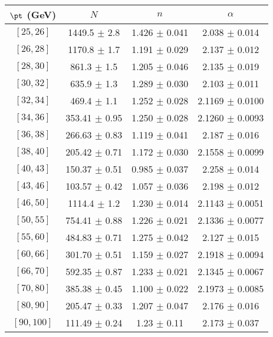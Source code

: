 \begin{tabular}{c||c|c|c}
$\pt$ (GeV) & $N$ & $n$ & $\alpha$ \\
\hline
$[25, 26]$ & 1449.5 $\pm$ 2.8 & 1.426 $\pm$ 0.041 & 2.038 $\pm$ 0.014\\
$[26, 28]$ & 1170.8 $\pm$ 1.7 & 1.191 $\pm$ 0.029 & 2.137 $\pm$ 0.012\\
$[28, 30]$ & 861.3 $\pm$ 1.5 & 1.205 $\pm$ 0.046 & 2.135 $\pm$ 0.019\\
$[30, 32]$ & 635.9 $\pm$ 1.3 & 1.289 $\pm$ 0.030 & 2.103 $\pm$ 0.011\\
$[32, 34]$ & 469.4 $\pm$ 1.1 & 1.252 $\pm$ 0.028 & 2.1169 $\pm$ 0.0100\\
$[34, 36]$ & 353.41 $\pm$ 0.95 & 1.250 $\pm$ 0.028 & 2.1260 $\pm$ 0.0093\\
$[36, 38]$ & 266.63 $\pm$ 0.83 & 1.119 $\pm$ 0.041 & 2.187 $\pm$ 0.016\\
$[38, 40]$ & 205.42 $\pm$ 0.71 & 1.172 $\pm$ 0.030 & 2.1558 $\pm$ 0.0099\\
$[40, 43]$ & 150.37 $\pm$ 0.51 & 0.985 $\pm$ 0.037 & 2.258 $\pm$ 0.014\\
$[43, 46]$ & 103.57 $\pm$ 0.42 & 1.057 $\pm$ 0.036 & 2.198 $\pm$ 0.012\\
$[46, 50]$ & 1114.4 $\pm$ 1.2 & 1.230 $\pm$ 0.014 & 2.1143 $\pm$ 0.0051\\
$[50, 55]$ & 754.41 $\pm$ 0.88 & 1.226 $\pm$ 0.021 & 2.1336 $\pm$ 0.0077\\
$[55, 60]$ & 484.83 $\pm$ 0.71 & 1.275 $\pm$ 0.042 & 2.127 $\pm$ 0.015\\
$[60, 66]$ & 301.70 $\pm$ 0.51 & 1.159 $\pm$ 0.027 & 2.1918 $\pm$ 0.0094\\
$[66, 70]$ & 592.35 $\pm$ 0.87 & 1.233 $\pm$ 0.021 & 2.1345 $\pm$ 0.0067\\
$[70, 80]$ & 385.38 $\pm$ 0.45 & 1.100 $\pm$ 0.022 & 2.1973 $\pm$ 0.0085\\
$[80, 90]$ & 205.47 $\pm$ 0.33 & 1.207 $\pm$ 0.047 & 2.176 $\pm$ 0.016\\
$[90, 100]$ & 111.49 $\pm$ 0.24 & 1.23 $\pm$ 0.11 & 2.173 $\pm$ 0.037\\
\end{tabular}
